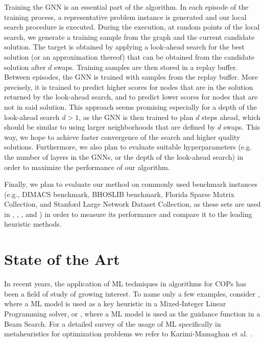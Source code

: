 \documentclass[11pt]{article}
\begin{document}
Training the GNN is an essential part of the algorithm. In each episode of the training process, a representative problem instance is generated and our local search procedure is executed. During the execution, at random points of the local search, we generate a training sample from the graph and the current candidate solution. The target is obtained by applying a look-ahead search for the best solution (or an approximation thereof) that can be obtained from the candidate solution after $d$ swaps. Training samples are then stored in a replay buffer. Between episodes, the GNN is trained with samples from the replay buffer. More precisely, it is trained to predict higher scores for nodes that are in the solution returned by the look-ahead search, and to predict lower scores for nodes that are not in said solution. This approach seems promising especially for a depth of the look-ahead search $d > 1$, as the GNN is then trained to plan $d$ steps ahead, which should be similar to using larger neighborhoods that are defined by $d$ swaps. This way, we hope to achieve faster convergence of the search and higher quality solutions.
Furthermore, we also plan to evaluate suitable hyperparameters (e.g. the number of layers in the GNNs, or the depth of the look-ahead search) in order to maximize the performance of our algorithm. 

Finally, we plan to evaluate our method on commonly used benchmark instances (e.g., DIMACS benchmark, BHOSLIB benchmark, Florida Sparse Matrix Collection, and Stanford Large Network Dataset Collection, as these sets are used in \cite{djeddi_extension_2019}, \cite{pinto_biased_2018}, \cite{chen_nuqclq_2021}, and \cite{zhou_opposition-based_2020}) in order to measure its performance and compare it to the leading heuristic methods. 

\section{State of the Art}

In recent years, the application of ML techniques in algorithms for COPs has been a field of study of growing interest. To name only a few examples, consider \cite{Zarpellon2021}, where a ML model is used as a key heuristic in a Mixed-Integer Linear Programming solver, or \cite{Huber2021}, where a ML model is used as the guidance function in a Beam Search. For a detailed survey of the usage of ML specifically in metaheuristics for optimization problems we refer to Karimi-Mamaghan et al. \cite{KARIMIMAMAGHAN2022393}. 
\end{document}
